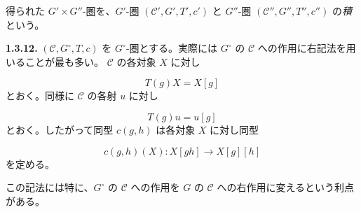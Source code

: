 得られた $G'\times G''$-圏を、$G'$-圏 $(\mathcal C',G',T',c')$ と
$G''$-圏 $(\mathcal C'',G'',T'',c'')$ の\emph{積}という。

\noindent\textbf{1.3.12.}\quad
$(\mathcal C,G^\circ,T,c)$ を $G^\circ$-圏とする。実際には
$G^\circ$ の $\mathcal C$ への作用に右記法を用いることが最も多い。
$\mathcal C$ の各対象 $X$ に対し

\begin{equation}
  T(g)X=X[g]
  \tag{1.3.12.1}
\end{equation}
とおく。同様に $\mathcal C$ の各射 $u$ に対し

\begin{equation}
  T(g)u=u[g]
  \tag{1.3.12.2}
\end{equation}
とおく。したがって同型 $c(g,h)$ は各対象 $X$ に対し同型

\begin{equation}
  c(g,h)(X)\colon X[gh]\longrightarrow X[g][h]
  \tag{1.3.12.3}
\end{equation}
を定める。

この記法には特に、$G^\circ$ の $\mathcal C$ への作用を $G$ の
$\mathcal C$ への右作用に変えるという利点がある。

